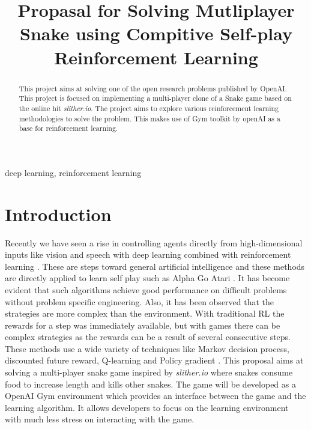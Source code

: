 \documentclass[conference]{IEEEtran}
\begin{document}
\title{Propasal for Solving Mutliplayer Snake using Compitive Self-play Reinforcement Learning}

\author{
\and
{}
\and
{}
}

\maketitle

\begin{abstract}
This project aims at solving one of the open research problems published by OpenAI\cite{n3}. This project is focused on implementing a multi-player clone of a Snake game based on the online hit \textit{slither.io}. The project aims to explore various reinforcement learning methodologies to solve the problem. This makes use of Gym toolkit by openAI as a base for reinforcement learning. 
\end{abstract}

\begin{IEEEkeywords}
deep learning, reinforcement learning
\end{IEEEkeywords}

\section{Introduction}
Recently we have seen a rise in controlling agents directly from
high-dimensional inputs like vision and speech with deep learning combined
with reinforcement learning \cite{sd3} \cite{sd5}. These are steps toward
general artificial intelligence and these methods are directly applied to
learn self play such as Alpha Go \cite{sd6} Atari \cite{sd3}. It has become
evident that such algorithms achieve good performance on difficult problems
without problem specific engineering. Also, it has been observed that the
strategies are more complex than the environment. With traditional RL the
rewards for a step was immediately available, but with games there can be
complex strategies as the rewards can be a result of several consecutive steps.
These methods use a wide variety of techniques like Markov decision process,
discounted future reward, Q-learning \cite{sd5} and
Policy gradient \cite{sd4}.\break
This proposal aims at solving a multi-player snake game inspired by
\textit{slither.io} \cite{sd2} where snakes consume food to increase length and
kills other snakes. The game will be developed as a
OpenAI Gym \cite{sd2} environment which provides an interface between the game
and the learning algorithm. It allows developers to focus on the learning
environment with much less stress on interacting with the game.
\end{document}
